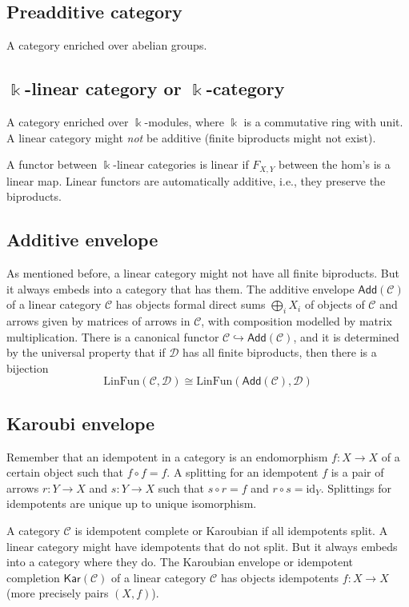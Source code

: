 \documentclass[11pt]{article}
\theoremstyle{definition}
\begin{document}
\subsection{Preadditive category}
A category enriched over abelian groups.

\subsection{$\Bbbk$-linear category or $\Bbbk$-category}
A category enriched over $\Bbbk$-modules, where $\Bbbk$ is a commutative ring with unit. A linear category might \emph{not} be additive (finite biproducts might not exist).

A functor between $\Bbbk$-linear categories is linear if $F_{X,Y}$ between the hom's is a linear map. Linear functors are automatically additive, i.e., they preserve the biproducts.

\subsection{Additive envelope}
As mentioned before, a linear category might not have all finite biproducts. But it always embeds into a category that has them. The additive envelope $\mathsf{Add}(\mathcal{C})$ of a linear category $\mathcal{C}$ has objects formal direct sums $\bigoplus_i X_i$ of objects of $\mathcal{C}$ and arrows given by matrices of arrows in $\mathcal{C}$, with composition modelled by matrix
multiplication. There is a canonical functor $\mathcal{C} \hookrightarrow \mathsf{Add}(\mathcal{C})$, and it is determined by the universal property that if $\mathcal{D}$ has all finite biproducts, then there is a bijection
\[
\mathrm{LinFun}(\mathcal{C}, \mathcal{D}) \cong \mathrm{LinFun}(\mathsf{Add}(\mathcal{C}), \mathcal{D})
\]

\subsection{Karoubi envelope}
Remember that an idempotent in a category is an endomorphism $f: X \to X$ of a certain object such that $f \circ f = f$. A splitting for an idempotent $f$ is a pair of arrows $r: Y \to X$ and $s: Y \to X$ such that $s \circ r = f$ and $r \circ s = \mathrm{id}_Y$. Splittings for idempotents are unique up to unique isomorphism.

A category $\mathcal{C}$ is idempotent complete or Karoubian if all idempotents split. A linear category might have idempotents that do not split. But it always embeds into a category where they do. The Karoubian envelope or idempotent completion $\mathsf{Kar}(\mathcal{C})$ of a linear category $\mathcal{C}$ has objects idempotents $f: X \to X$ (more precisely pairs $(X,f)$).
\end{document}

